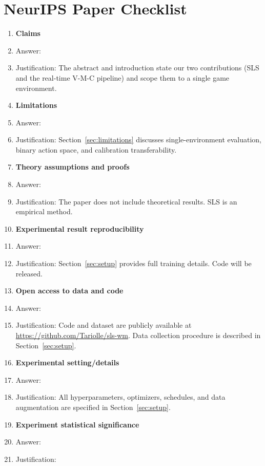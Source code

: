 \section*{NeurIPS Paper Checklist}

\begin{enumerate}

\item {\bf Claims}
    \item[] Answer: \answerYes{}
    \item[] Justification: The abstract and introduction state our two contributions (SLS and the real-time V-M-C pipeline) and scope them to a single game environment.

\item {\bf Limitations}
    \item[] Answer: \answerYes{}
    \item[] Justification: Section~\ref{sec:limitations} discusses single-environment evaluation, binary action space, and calibration transferability.

\item {\bf Theory assumptions and proofs}
    \item[] Answer: \answerNA{}
    \item[] Justification: The paper does not include theoretical results. SLS is an empirical method.

\item {\bf Experimental result reproducibility}
    \item[] Answer: \answerYes{}
    \item[] Justification: Section~\ref{sec:setup} provides full training details. Code will be released.

\item {\bf Open access to data and code}
    \item[] Answer: \answerYes{}
    \item[] Justification: Code and dataset are publicly available at \url{https://github.com/Tariolle/sls-wm}. Data collection procedure is described in Section~\ref{sec:setup}.

\item {\bf Experimental setting/details}
    \item[] Answer: \answerYes{}
    \item[] Justification: All hyperparameters, optimizers, schedules, and data augmentation are specified in Section~\ref{sec:setup}.

\item {\bf Experiment statistical significance}
    \item[] Answer: \answerTODO{}
    \item[] Justification: \justificationTODO{}


\end{enumerate}
